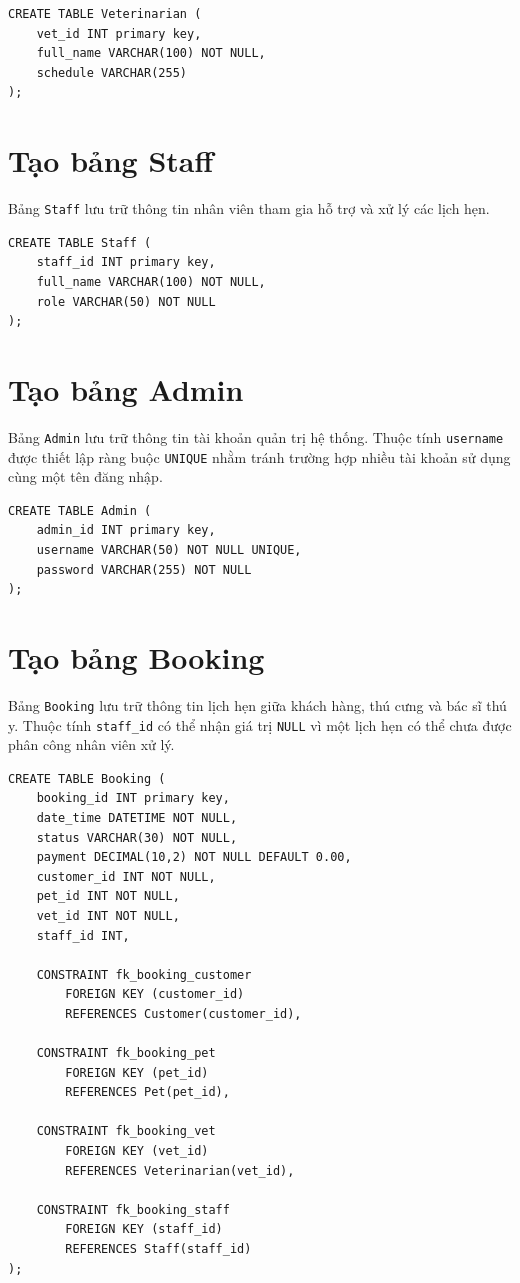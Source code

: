 \begin{verbatim}
CREATE TABLE Veterinarian (
    vet_id INT primary key,
    full_name VARCHAR(100) NOT NULL,
    schedule VARCHAR(255)
);
\end{verbatim}

\section{Tạo bảng Staff}
Bảng \texttt{Staff} lưu trữ thông tin nhân viên tham gia hỗ trợ và xử lý các lịch hẹn.

\begin{verbatim}
CREATE TABLE Staff (
    staff_id INT primary key,
    full_name VARCHAR(100) NOT NULL,
    role VARCHAR(50) NOT NULL
);
\end{verbatim}

\section{Tạo bảng Admin}
Bảng \texttt{Admin} lưu trữ thông tin tài khoản quản trị hệ thống. Thuộc tính \texttt{username} được thiết lập ràng buộc \texttt{UNIQUE} nhằm tránh trường hợp nhiều tài khoản sử dụng cùng một tên đăng nhập.

\begin{verbatim}
CREATE TABLE Admin (
    admin_id INT primary key,
    username VARCHAR(50) NOT NULL UNIQUE,
    password VARCHAR(255) NOT NULL
);
\end{verbatim}

\section{Tạo bảng Booking}
Bảng \texttt{Booking} lưu trữ thông tin lịch hẹn giữa khách hàng, thú cưng và bác sĩ thú y. Thuộc tính \texttt{staff\_id} có thể nhận giá trị \texttt{NULL} vì một lịch hẹn có thể chưa được phân công nhân viên xử lý.

\begin{verbatim}
CREATE TABLE Booking (
    booking_id INT primary key,
    date_time DATETIME NOT NULL,
    status VARCHAR(30) NOT NULL,
    payment DECIMAL(10,2) NOT NULL DEFAULT 0.00,
    customer_id INT NOT NULL,
    pet_id INT NOT NULL,
    vet_id INT NOT NULL,
    staff_id INT,

    CONSTRAINT fk_booking_customer
        FOREIGN KEY (customer_id)
        REFERENCES Customer(customer_id),

    CONSTRAINT fk_booking_pet
        FOREIGN KEY (pet_id)
        REFERENCES Pet(pet_id),

    CONSTRAINT fk_booking_vet
        FOREIGN KEY (vet_id)
        REFERENCES Veterinarian(vet_id),

    CONSTRAINT fk_booking_staff
        FOREIGN KEY (staff_id)
        REFERENCES Staff(staff_id)
);
\end{verbatim}


